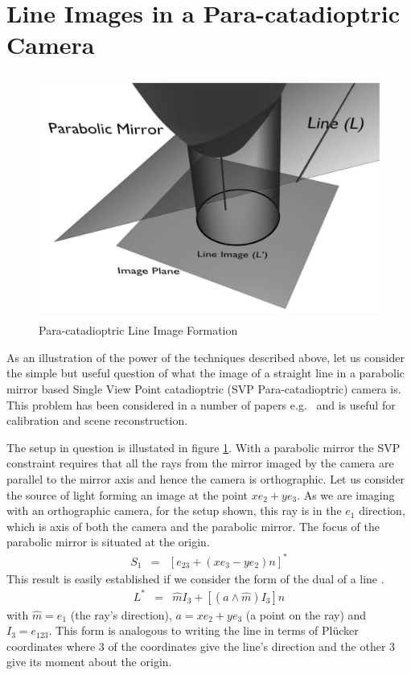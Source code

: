 \section{Line Images in a Para-catadioptric Camera}
\begin{figure}[ht]
\includegraphics[height=8cm]{testparaboloid2}
\caption{Para-catadioptric Line Image Formation}
\label{fig:bob}
\end{figure}
As an illustration of the power of the techniques described above, let us consider the simple but
 useful question of what the image of a straight line in a parabolic mirror based Single View Point 
catadioptric (SVP Para-catadioptric) camera is.  This problem has been considered in a number 
of papers e.g.\ \cite{CAM:gd, CAM:YH04, CAM:BA03b, CAM:bclf} and is useful for calibration 
and scene reconstruction.

The setup in question is illustated in figure \ref{fig:bob}. With a parabolic
mirror the SVP constraint requires that all the rays from the mirror imaged by
the camera are parallel to the mirror axis and hence the camera is
orthographic. Let us consider the source of light forming an image at the point
$xe_2 + ye_3$.  As we are imaging with an orthographic camera, for the setup
shown, this ray is in the $e_1$ direction, which is axis of both the camera and the parabolic mirror.  The focus of the parabolic mirror is situated at the origin. 
\begin{eqnarray}  
S_1&=& \left[e_{23} + (xe_3 - ye_2)n\right]^* \nonumber
\end{eqnarray} 
This result is easily established if we consider the form of the dual of a line \cite{cgwcga}.
\begin{eqnarray}
L^* &=&	\hat{m}I_3 + [(a\wedge \hat{m})I_3]n\nonumber
\end{eqnarray}
with $\hat{m} = e_1$ (the ray's direction), $a = xe_2 + ye_3$ (a point on the ray) and $I_3 = e_{123}$.
This form is analogous to writing the line in terms of Pl\"{u}cker coordinates where 3 of the coordinates give the line's direction and the other 3 give its moment about the origin.



